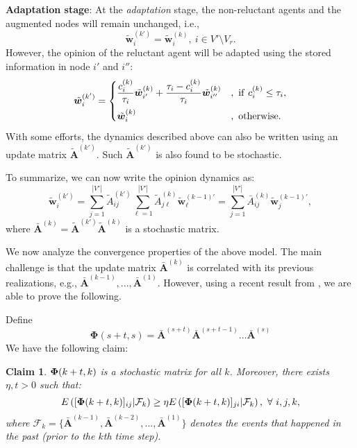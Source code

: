 \documentclass[letter]{article}
\newtheorem{Claim}{Claim}
\theoremstyle{remark}
\begin{document}
\textbf{Adaptation stage}: At the \emph{adaptation} stage, the non-reluctant agents and the augmented nodes will remain unchanged, i.e.,
\[
\tilde{\bm w}_i^{(k')} = \tilde{\bm w}_i^{(k)},~i \in V' \setminus V_r.
\]
However, the opinion of the reluctant agent will be adapted using the stored information in node $i'$ and $i''$:
\[
\tilde{\bm w}_i^{(k')} = \begin{cases}
\displaystyle \frac{c_i^{(k)}}{\tau_i} \tilde{\bm w}_{i'}^{(k)} + \frac{\tau_i - c_i^{(k)}}{\tau_i} \tilde{\bm w}_{i''}^{(k)} &,~{\rm if}~c_i^{(k)} \leq \tau_i, \vspace{.2cm} \\
\tilde{\bm w}_i^{(k)} &,~{\rm otherwise}.
\end{cases}
\]
With some efforts, the dynamics described above can also be written using an update matrix $\tilde{\bm A}^{(k')}$. Such $\tilde{\bm A}^{(k')}$ is also found to be stochastic.

To summarize, we can now write the opinion dynamics as:
\[
\tilde{\bm w}_i^{(k')} = \sum_{j=1}^{|V'|} \tilde{A}_{ij}^{(k')} \sum_{\ell=1}^{|V'|} \tilde{A}_{j \ell}^{(k)} \tilde{\bm w}_{\ell}^{(k-1)'} =  \sum_{j=1}^{|V'|} \bar{A}_{ij}^{(k)} \tilde{\bm w}_{j}^{(k-1)'},
\]
where $\bar{\bm A}^{(k)} = \tilde{\bm A}^{(k')}  \tilde{\bm A}^{(k)}$ is a stochastic matrix. 

We now analyze the convergence properties of the above model.
The main challenge is that the update matrix $\bar{\bm A}^{(k)}$ is correlated with its previous realizations, e.g., $\bar{\bm A}^{(k-1)}, ..., \bar{\bm A}^{(1)}$. 
However, using a recent result from \cite{Touri2014}, we are able to prove the following. 

Define 
\[
\bm{\Phi} (s+t,s) = \bar{\bm A}^{(s+t)}  \bar{\bm A}^{(s+t-1)} \ldots  \bar{\bm A}^{(s)}
\]
We have the following claim:
\begin{Claim}
${\bf \Phi} (k+t,k)$ is a stochastic matrix for all $k$. Moreover, there exists $\eta, t > 0$ such that:
\begin{equation} \label{eq:claim}
E \left( [{\bf \Phi} (k+t,k)]_{ij} | \mathcal{F}_{k} \right) \geq \eta E \left( [{\bf \Phi} (k+t,k)]_{ji} | \mathcal{F}_{k} \right),~\forall~i,j,k,
\end{equation}
where $ \mathcal{F}_{k}  = \{  \bar{\bm A}^{(k-1)},  \bar{\bm A}^{(k-2)}, ...,  \bar{\bm A}^{(1)} \}$ denotes the events that happened in the past (prior to the $k$th time step). 
\end{Claim}
\end{document}
